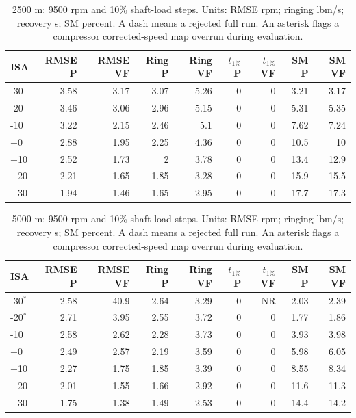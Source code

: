 \documentclass[11pt,a4paper]{article}
\begin{document}
\begin{table}[H]\centering\small
\setlength{\tabcolsep}{5pt}
\begin{tabular}{@{}lrrrrrrrr@{}}\toprule
ISA & RMSE P & RMSE VF & Ring P & Ring VF & $t_{1\%}$ P & $t_{1\%}$ VF & SM P & SM VF\\\midrule
-30 & 3.58 & 3.17 & 3.07 & 5.26 & 0 & 0 & 3.21 & 3.17\\
-20 & 3.46 & 3.06 & 2.96 & 5.15 & 0 & 0 & 5.31 & 5.35\\
-10 & 3.22 & 2.15 & 2.46 & 5.1 & 0 & 0 & 7.62 & 7.24\\
+0 & 2.88 & 1.95 & 2.25 & 4.36 & 0 & 0 & 10.5 & 10\\
+10 & 2.52 & 1.73 & 2 & 3.78 & 0 & 0 & 13.4 & 12.9\\
+20 & 2.21 & 1.65 & 1.85 & 3.28 & 0 & 0 & 15.9 & 15.5\\
+30 & 1.94 & 1.46 & 1.65 & 2.95 & 0 & 0 & 17.7 & 17.3\\
\bottomrule\end{tabular}\caption{2500 m: 9500 rpm and 10\% shaft-load steps. Units: RMSE rpm; ringing lbm/s; recovery s; SM percent. A dash means a rejected full run. An asterisk flags a compressor corrected-speed map overrun during evaluation.}\end{table}

\clearpage

\begin{table}[H]\centering\small
\setlength{\tabcolsep}{5pt}
\begin{tabular}{@{}lrrrrrrrr@{}}\toprule
ISA & RMSE P & RMSE VF & Ring P & Ring VF & $t_{1\%}$ P & $t_{1\%}$ VF & SM P & SM VF\\\midrule
-30$^*$ & 2.58 & 40.9 & 2.64 & 3.29 & 0 & NR & 2.03 & 2.39\\
-20$^*$ & 2.71 & 3.95 & 2.55 & 3.72 & 0 & 0 & 1.77 & 1.86\\
-10 & 2.58 & 2.62 & 2.28 & 3.73 & 0 & 0 & 3.93 & 3.98\\
+0 & 2.49 & 2.57 & 2.19 & 3.59 & 0 & 0 & 5.98 & 6.05\\
+10 & 2.27 & 1.75 & 1.85 & 3.39 & 0 & 0 & 8.55 & 8.34\\
+20 & 2.01 & 1.55 & 1.66 & 2.92 & 0 & 0 & 11.6 & 11.3\\
+30 & 1.75 & 1.38 & 1.49 & 2.53 & 0 & 0 & 14.4 & 14.2\\
\bottomrule\end{tabular}\caption{5000 m: 9500 rpm and 10\% shaft-load steps. Units: RMSE rpm; ringing lbm/s; recovery s; SM percent. A dash means a rejected full run. An asterisk flags a compressor corrected-speed map overrun during evaluation.}\end{table}
\end{document}
